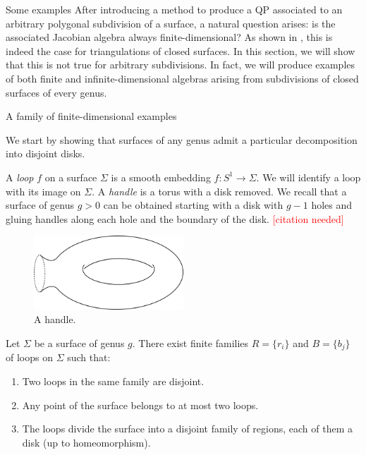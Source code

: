 \begin{chapter}{Some examples}
After introducing a method to produce a QP associated to an arbitrary polygonal subdivision of a surface, a natural question arises: is the associated Jacobian algebra always finite-dimensional? As shown in \cite{Lad12}, this is indeed the case for triangulations of closed surfaces. In this section, we will show that this is not true for arbitrary subdivisions. In fact, we will produce examples of both finite and infinite-dimensional algebras arising from subdivisions of closed surfaces of every genus.
\begin{section}{A family of finite-dimensional examples}

We start by showing that surfaces of any genus admit a particular decomposition into disjoint disks.

A \emph{loop} $f$ on a surface $\Sigma$ is a smooth embedding $f:S^1\to \Sigma$. We will identify a loop with its image on $\Sigma$. A \emph{handle} is a torus with a disk removed. We recall that a surface of genus $g>0$ can be obtained starting with a disk with $g-1$ holes and gluing handles along each hole and the boundary of the disk. \textcolor{red}{[citation needed]}

\begin{figure}[h]
\centering
	\includegraphics[width=0.5\textwidth]{handle.png}
\caption{A handle.}
\end{figure}

\begin{prop}\label{surface-loops} Let $\Sigma$ be a surface of genus $g$. There exist finite families $R=\{r_i\}$ and $B=\{b_j\}$ of loops on $\Sigma$ such that:
\begin{enumerate}
\item Two loops in the same family are disjoint.
\item Any point of the surface belongs to at most two loops.
\item The loops divide the surface into a disjoint family of regions, each of them a disk (up to homeomorphism).
\end{enumerate}
\end{prop}


\end{section}
\end{chapter}
